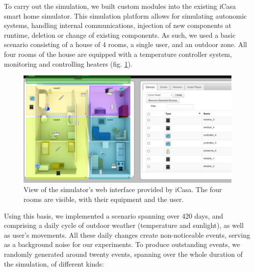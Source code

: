 \documentclass[conference]{IEEEtran}
\begin{document}

To carry out the simulation, we built custom modules into the existing iCasa
smart home simulator\cite{lalanda_self-aware_2017}. This simulation platform
allows for simulating autonomic systems, handling internal communications,
injection of new components at runtime, deletion or change of existing
components. As such, we used a basic scenario consisting of a house of 4 rooms,
a single user, and an outdoor zone. All four rooms of the house are equipped
with a temperature controller system, monitoring and controlling heaters (fig.
\ref{fig:view}).

\begin{figure}[ht]
  \centering
  \includegraphics[width=\linewidth]{figures/simulator}
  \caption{View of the simulator's web interface provided by iCasa. The four
    rooms are visible, with their equipment and the user.}
  \label{fig:view}
\end{figure}

Using this basis, we implemented a scenario spanning over 420 days, and
comprising a daily cycle of outdoor weather (temperature and sunlight), as well
as user's movements. All these daily changes create non-noticeable events,
serving as a background noise for our experiments. To produce outstanding
events, we randomly generated around twenty events, spanning over the whole
duration of the simulation, of different kinds:
\end{document}
